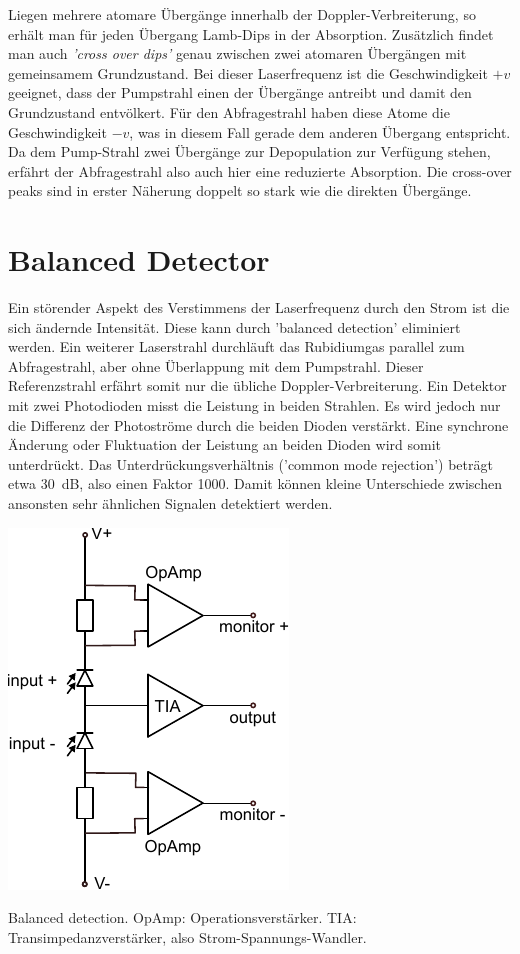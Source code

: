 Liegen mehrere atomare Übergänge innerhalb der Doppler-Verbreiterung, so erhält man für jeden Übergang Lamb-Dips in der Absorption. Zusätzlich findet man auch \emph{'cross over dips'} genau zwischen zwei atomaren Übergängen mit gemeinsamem Grundzustand. Bei dieser Laserfrequenz ist die Geschwindigkeit $+v$ geeignet, dass der Pumpstrahl einen der Übergänge antreibt und damit den Grundzustand entvölkert. Für den Abfragestrahl haben diese Atome die Geschwindigkeit $-v$, was in diesem Fall gerade dem anderen Übergang entspricht. Da dem Pump-Strahl zwei Übergänge zur Depopulation zur Verfügung stehen, erfährt der  Abfragestrahl  also auch hier eine reduzierte Absorption. Die cross-over peaks sind in erster Näherung doppelt so stark wie die direkten Übergänge.


\begin{questions}
\end{questions}
	

\section{Balanced Detector}

Ein störender Aspekt des Verstimmens der Laserfrequenz durch den Strom ist die sich ändernde Intensität. Diese kann durch 'balanced detection' eliminiert werden. Ein weiterer Laserstrahl durchläuft das Rubidiumgas parallel zum Abfragestrahl, aber ohne Überlappung mit dem Pumpstrahl. Dieser Referenzstrahl erfährt somit nur die übliche Doppler-Verbreiterung. Ein Detektor mit zwei Photodioden misst die Leistung in beiden Strahlen. Es wird jedoch nur die Differenz der Photoströme durch die beiden Dioden verstärkt. Eine synchrone Änderung oder Fluktuation der Leistung an beiden Dioden wird somit unterdrückt. Das Unterdrückungsverhältnis ('common mode rejection') beträgt etwa 30~dB, also einen Faktor 1000. Damit können kleine Unterschiede zwischen ansonsten sehr ähnlichen Signalen detektiert werden.

\begin{marginfigure}
	\includegraphics{bilder/balanced.pdf}
	\caption{Balanced detection. OpAmp: Operationsverstärker. TIA: Transimpedanzverstärker, also Strom-Spannungs-Wandler.}
\end{marginfigure}

